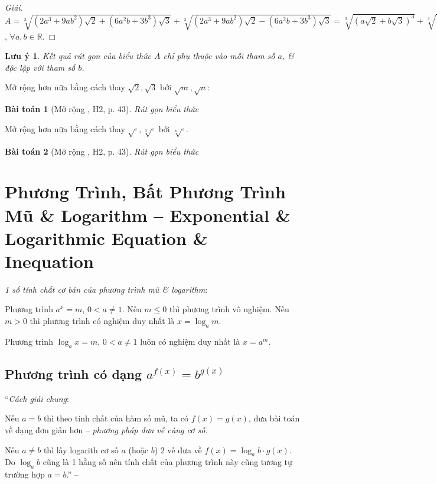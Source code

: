 \documentclass{article}
\numberwithin{equation}{section}
\newtheorem{baitoan}{Bài toán}[section]
\newtheorem{luuy}{Lưu ý}[section]
\begin{document}
\begin{proof}[Giải]
	$A = \sqrt[3]{(2a^3 + 9ab^2)\sqrt{2} + (6a^2b + 3b^3)\sqrt{3}} + \sqrt[3]{(2a^3 + 9ab^2)\sqrt{2} - (6a^2b + 3b^3)\sqrt{3}} = \sqrt[3]{(a\sqrt{2} + b\sqrt{3})^3} + \sqrt[3]{(a\sqrt{2} - b\sqrt{3})^3} = a\sqrt{2} + b\sqrt{3} + a\sqrt{2} - b\sqrt{3} = 2a\sqrt{2}$, $\forall a,b\in\mathbb{R}$.
\end{proof}

\begin{luuy}
	Kết quả rút gọn của biểu thức $A$ chỉ phụ thuộc vào mỗi tham số $a$, \& độc lập với tham số $b$.
\end{luuy}
Mở rộng hơn nữa bằng cách thay $\sqrt{2},\sqrt{3}$ bởi $\sqrt{m},\sqrt{n}$:

\begin{baitoan}[Mở rộng \cite{TL_chuyen_Toan_Giai_Tich_12}, H2, p. 43]
	Rút gọn biểu thức
	
\end{baitoan}
Mở rộng hơn nữa bằng cách thay $\sqrt{\cdot},\sqrt[3]{\cdot}$ bởi $\sqrt[n]{\cdot}$.
\begin{baitoan}[Mở rộng \cite{TL_chuyen_Toan_Giai_Tich_12}, H2, p. 43]
	Rút gọn biểu thức
	
\end{baitoan}


\section{Phương Trình, Bất Phương Trình Mũ \& Logarithm -- Exponential \& Logarithmic Equation \& Inequation}
\textit{1 số tính chất cơ bản của phương trình mũ \& logarithm}:
\begin{enumerate*}
	\item[$\bullet$] Phương trình $a^x = m$, $0 < a\ne 1$. Nếu $m\le 0$ thì phương trình vô nghiệm. Nếu $m > 0$ thì phương trình có nghiệm duy nhất là $x = \log_am$.
	\item[$\bullet$] Phương trình $\log_ax = m$, $0 < a\ne 1$ luôn có nghiệm duy nhất là $x = a^m$.
\end{enumerate*}

\subsection{Phương trình có dạng $a^{f(x)} = b^{g(x)}$}
``\textit{Cách giải chung}:
\begin{enumerate*}
	\item[$\bullet$] Nếu $a = b$ thì theo tính chất của hàm số mũ, ta có $f(x) = g(x)$, đưa bài toán về dạng đơn giản hơn -- \textit{phương pháp đưa về cùng cơ số}.
	\item[$\bullet$] Nếu $a\ne b$ thì lấy logarith cơ số $a$ (hoặc $b$) 2 vế đưa về $f(x) = \log_ab\cdot g(x)$. Do $\log_ab$ cũng là 1 hằng số nên tính chất của phương trình này cũng tương tự trường hợp $a = b$.'' -- \cite[p. 71]{TL_chuyen_Toan_Giai_Tich_12}
\end{enumerate*}
\end{document}

